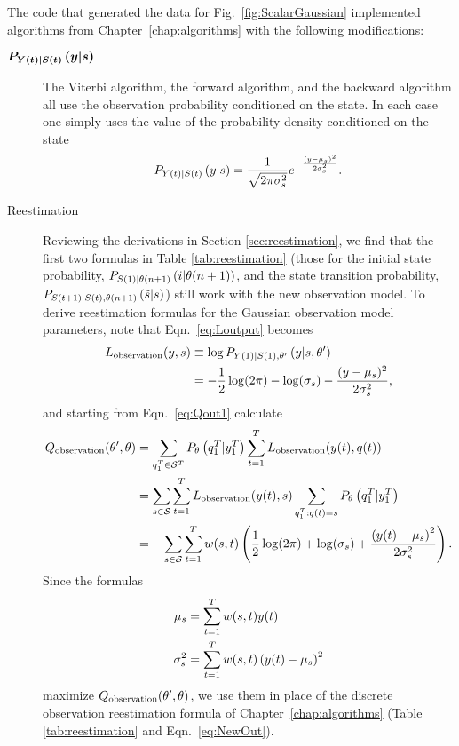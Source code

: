 The code that generated the data for Fig.~\ref{fig:ScalarGaussian}
implemented algorithms from Chapter~\ref{chap:algorithms} with the
following modifications:
\begin{description} 
\item[$\bm{P_{{Y}{(t)}|{S}{(t)}} \left(y|s \right)}$] The Viterbi
  algorithm, the forward algorithm, and the backward algorithm all use
  the observation probability conditioned on the state. In each case one
  simply uses the value of the probability density conditioned on the
  state
  \begin{equation*}
    P_{{Y}{(t)}|{S}{(t)}} \left(y|s \right) = \frac{1}{\sqrt{2\pi
    \sigma_s^2}} e^{-\frac{(y-\mu_s)^2}{2\sigma_s^2}}.
  \end{equation*}
\newpage%
\item[Reestimation] Reviewing the derivations in Section
  \ref{sec:reestimation}, we find that the first two formulas in Table
  \ref{tab:reestimation} (those for the initial state probability, %
  $P_{{S}{(1)}|{\theta}{(n+1)}} \left(i|{\theta}{(n+1)} \right)$, 
  and the state transition probability,
  $P_{{S}{(t+1)}|{S}{(t)},{\theta}{(n+1)}} \left({\tilde s}|s \right)$) 
  still work with the new observation model.  To derive reestimation
  formulas for the Gaussian observation model parameters, note that
  Eqn.~\eqref{eq:Loutput} becomes %
  \begin{align}
    L_{\text{observation}}(y,s) & \equiv \log
  P_{{Y}{(1)}|{S}{(1)},\theta'} \left(y|s,\theta' \right)\\
    \label{eq:LoutputG}
    &= -\frac{1}{2} \log (2\pi) - \log(\sigma_s) -
    \frac{(y-\mu_s)^2}{2\sigma_s^2},
  \end{align}
  and starting from Eqn.~\eqref{eq:Qout1} calculate
\begin{align}
  \label{eq:QoutG1}
  Q_{\text{observation}} (\parameters',\parameters) &=
  \sum_{\ts{q}{1}{T}\in\states^T} P_{\parameters}
  \left(\ts{q}{1}{T}|\ts{y}{1}{T} \right) \sum_{t=1}^T
  L_{\text{observation}}(\ti{y}{t},\ti{q}{t})\\
  \label{eq:QoutG2}
  &= \sum_{s\in\states} \sum_{t=1}^T L_{\text{observation}}(\ti{y}{t},s)
  \sum_{\ts{q}{1}{T}:\ti{q}{t}=s }P_{\parameters}
  \left(\ts{q}{1}{T}|\ts{y}{1}{T} \right) \\
  \label{eq:QoutG3}
  &= - \sum_{s\in\states} \sum_{t=1}^T w(s,t) \left( \frac{1}{2}
    \log(2\pi) + \log(\sigma_s) + \frac{\left( \ti{y}{t}-\mu_s
      \right)^2}{2\sigma_s^2} \right).
\end{align}
Since the formulas
\begin{align}
  \label{eq:NewMuG}
  \mu_s &= \sum_{t=1}^T w(s,t) {y}{(t)} \\
  \sigma_s^2 &= \sum_{t=1}^T w(s,t)\left( {y}{(t)}-\mu_s \right)^2
\end{align}
maximize $Q_{\text{observation}} (\theta',\theta)$, we use them in place
of the discrete observation reestimation formula of
Chapter~\ref{chap:algorithms} (Table \ref{tab:reestimation} and
Eqn.~\eqref{eq:NewOut}).
%
\end{description}


